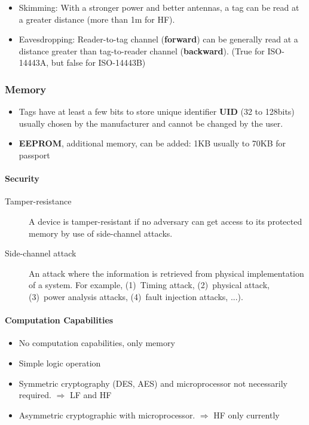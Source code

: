 \begin{itemize}
    \item Skimming: With a stronger power and better antennas, a tag
        can be read at a greater distance (more than 1m for HF).
    \item Eavesdropping: Reader-to-tag channel (\textbf{forward}) can be
        generally read at a distance greater than tag-to-reader channel
        (\textbf{backward}). (True for \textsc{ISO-14443A}, but false
        for \textsc{ISO-14443B})
\end{itemize}

\subsubsection{Memory}
\begin{itemize}
    \item Tags have at least a few bits to store unique identifier
        \textbf{UID} (32 to 128bits) usually chosen by the manufacturer
        and cannot be changed by the user.
    \item \textbf{EEPROM}, additional memory, can be added: 1KB usually
        to 70KB for passport
\end{itemize}

\paragraph{Security}

\begin{description}
    \item[Tamper-resistance] A device is tamper-resistant if no adversary can
    get access to its protected memory by use of side-channel attacks.
    \item[Side-channel attack] An attack where the information is
        retrieved from physical implementation of a system. For example,
        (1)~Timing attack, (2)~physical attack, (3)~power analysis
        attacks, (4)~fault injection attacks, ...).
\end{description}

\paragraph{Computation Capabilities}
\begin{itemize}
    \item No computation capabilities, only memory
    \item Simple logic operation
    \item Symmetric cryptography (DES, AES) and microprocessor not
        necessarily required. $\Rightarrow$ LF and HF
    \item Asymmetric cryptographic with microprocessor.
        $\Rightarrow$ HF only currently
\end{itemize}

